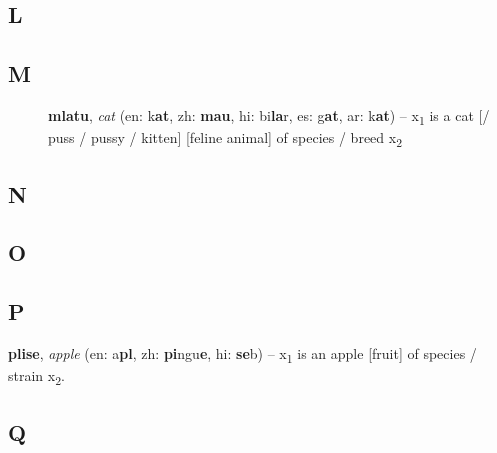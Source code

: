 \documentclass[12pt]{book}
\begin{document}
\subsection{L}

\begin{description}
\item[ ]
\end{description}

\subsection{M}

\begin{description}
\item[ ] \textbf{mlatu}, \textit{cat} (en: k\textbf{at}, zh: \textbf{mau}, hi: bi\textbf{la}r, es: g\textbf{at}, ar: k\textbf{at}) -- x\textsubscript{1} is a cat [/ puss / pussy / kitten] [feline animal] of species / breed x\textsubscript{2}
\end{description}

\subsection{N}

\begin{description}
\item[ ]
\end{description}

\subsection{O}

\begin{description}
\item[ ]
\end{description}

\subsection{P}


\textbf{plise}, \textit{apple} (en: a\textbf{pl}, zh: \textbf{pi}ngu\textbf{e}, hi: \textbf{se}b) -- x\textsubscript{1} is an apple [fruit] of species / strain x\textsubscript{2}.

\subsection{Q}

\begin{description}
\item[ ]
\end{description}
\end{document}
